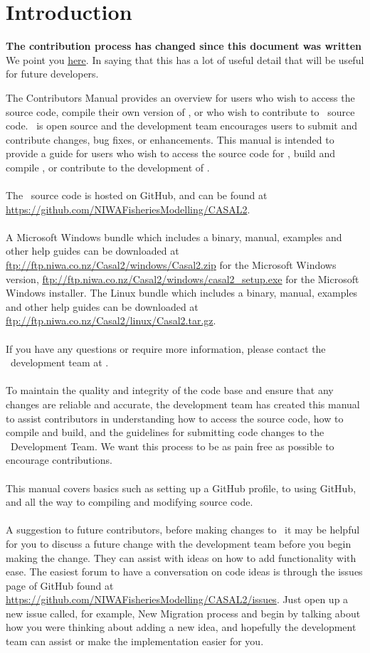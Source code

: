 \section{Introduction\label{sec:Introduction}}
\textbf{The contribution process has changed since this document was written} We point you \href{https://casal2.github.io/contributing/}{here}. In saying that this has a lot of useful detail that will be useful for future developers.




The Contributors Manual provides an overview for users who wish to access the source code, compile their own version of \CNAME , or who wish to contribute to \CNAME\ source code. \CNAME\ is open source and the development team encourages users to submit and contribute changes, bug fixes, or enhancements. This manual is intended to provide a guide for users who wish to access the source code for \CNAME , build and compile  \CNAME , or contribute to the development of \CNAME . 
\\\\
The \CNAME\ source code is hosted on GitHub, and can be found at \url{https://github.com/NIWAFisheriesModelling/CASAL2}.
\\\\
A Microsoft Windows bundle which includes a binary, manual, examples and other help guides can be downloaded at \url{ftp://ftp.niwa.co.nz/Casal2/windows/Casal2.zip} for the Microsoft Windows version, \url{ftp://ftp.niwa.co.nz/Casal2/windows/casal2_setup.exe} for the Microsoft Windows installer. The Linux bundle which includes a binary, manual, examples and other help guides can be downloaded at \url{ftp://ftp.niwa.co.nz/Casal2/linux/Casal2.tar.gz}.
\\\\
If you have any questions or require more information, please contact the \CNAME\ development team at \email.
\\\\
To maintain the quality and integrity of the code base and ensure that any changes are reliable and accurate, the development team has created this manual to assist contributors in understanding how to access the source code, how to compile and build, and the guidelines for submitting code changes to the \CNAME\ Development Team. We want this process to be as pain free as possible to encourage contributions. 
\\\\
This manual covers basics such as setting up a GitHub profile, to using GitHub, and all the way to compiling and modifying source code. 
\\\\
A suggestion to future contributors, before making changes to \CNAME\ it may be helpful for you to discuss a future change with the development team before you begin making the change. They can assist with ideas on how to add functionality with ease. The easiest forum to have a conversation on code ideas is through the issues page of GitHub found at \url{https://github.com/NIWAFisheriesModelling/CASAL2/issues}. Just open up a new issue called, for example, New Migration process and begin by talking about how you were thinking about adding a new idea, and hopefully the development team can assist or make the implementation easier for you.
